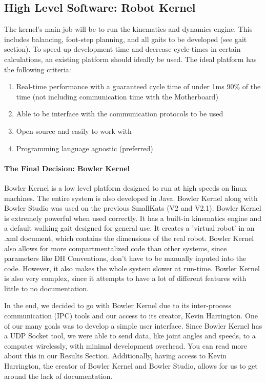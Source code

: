     
    \subsection{High Level Software: Robot Kernel}
        The kernel's main job will be to run the kinematics and dynamics engine. This includes balancing, foot-step planning, and all gaits to be developed (see gait section). To speed up development time and decrease cycle-times in certain calculations, an existing platform should ideally be used. The ideal platform has the following criteria:
        \begin{enumerate}
            \item Real-time performance with a guaranteed cycle time of under 1ms 90\% of the time (not including communication time with the Motherboard)
            \item Able to be interface with the communication protocols to be used
            \item Open-source and easily to work with
            \item Programming language agnostic (preferred)
        \end{enumerate}

        \paragraph*{The Final Decision: Bowler Kernel}
        Bowler Kernel is a low level platform designed to run at high speeds on linux machines. The entire system is also developed in Java. Bowler Kernel along with Bowler Studio was used on the previous SmallKats (V2 and V2.1). Bowler Kernel is extremely powerful when used correctly. It has a built-in kinematics engine and a default walking gait designed for general use. It creates a 'virtual robot' in an .xml document, which contains the dimensions of the real robot. Bowler Kernel also allows for more compartmentalized code than other systems, since parameters like DH Conventions, don't have to be manually inputed into the code. However, it also makes the whole system slower at run-time. Bowler Kernel is also very complex, since it attempts to have a lot of different features with little to no documentation.

        In the end, we decided to go with Bowler Kernel due to its inter-process communication (IPC) tools and our access to its creator, Kevin Harrington. One of our many goals was to develop a simple user interface. Since Bowler Kernel has a UDP Socket tool, we were able to send data, like joint angles and speeds, to a computer wirelessly, with minimal development overhead. You can read more about this in our Results Section. Additionally, having access to Kevin Harrington, the creator of Bowler Kernel and Bowler Studio, allows for us to get around the lack of documentation.

